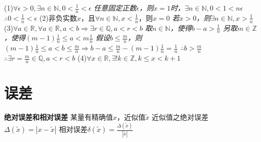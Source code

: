 \documentclass[11pt]{article}
\begin{document}
(1)$\forall\epsilon>0, \exists n\in\mathbb{N}, 0<\frac{1}{n}<\epsilon$ \newline
\textit{任意固定正数$\epsilon$，则$x=1$时，$\exists n\in\mathbb{N}, 0<1<n \epsilon$ \newline
$\therefore 0<\frac{1}{n}<\epsilon$} \newline
(2)非负实数$x$，且$\forall n\in\mathbb{N}, x<\frac{1}{n}$，则$x=0$ \newline
\textit{若$x>0$，则$\exists n\in\mathbb{N}, x>\frac{1}{n}$} \newline
(3)$\forall a\in\mathbb{R}, \forall a\in\mathbb{R}, a<b \Rightarrow \exists r\in\mathbb{Q}, a<r<b$ \newline
\textit{取$n\in\mathbb{N}$，使得$b-a>\frac{1}{n}$ \newline
另取$m\in\mathbb{Z}$，使得$(m-1)\frac{1}{n} \le a<m\frac{1}{n}$ \newline
假设$b\le \frac{m}{n}$，则$(m-1)\frac{1}{n}\le a<b \le\frac{m}{n}\Rightarrow b-a \le \frac{m}{n}-(m-1)\frac{1}{n}=\frac{1}{n}$ \newline
$\therefore b>\frac{m}{n}$ \newline
$\therefore \exists r=\frac{m}{n} \in\mathbb{Q},a<r<b$} \newline
(4)$\forall x\in\mathbb{R}, \exists!k\in\mathbb{Z}, k\le x<k+1$ \newline

\section{误差}
\textbf{绝对误差和相对误差}\newline
某量有精确值$x$，近似值$\tilde{x}$ \newline
近似值之绝对误差$\Delta(\tilde{x})=|x-\tilde{x}|$ \newline
相对误差$\delta(\tilde{x})=\frac{\Delta(\tilde{x})}{|\tilde{x}|}$ \newline
\end{document}

